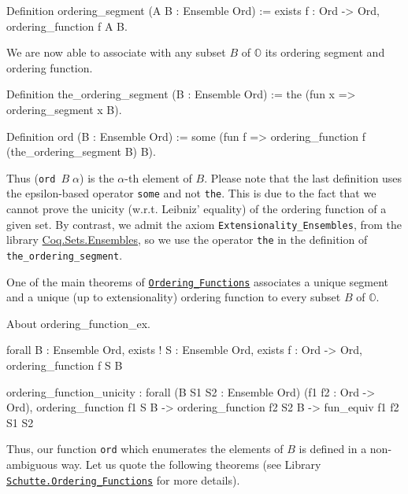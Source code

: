 {\begin{Coqsrc}
Definition ordering_segment (A B : Ensemble Ord) :=
  exists f : Ord -> Ord, ordering_function f A B.
\end{Coqsrc}


We are now able to associate with any subset $B$ of $\mathbb{O}$ its ordering segment and ordering function.

\begin{Coqsrc}
Definition the_ordering_segment (B : Ensemble Ord) :=
  the  (fun x => ordering_segment x B).

Definition ord  (B : Ensemble Ord) := 
  some (fun f => ordering_function f (the_ordering_segment B) B).
\end{Coqsrc}

Thus (\texttt{ord $B \;\alpha$}) is the $\alpha$-th element of $B$.
Please note that the last definition uses the epsilon-based operator \texttt{some} and
not \texttt{the}. This is due to the fact that we cannot prove the unicity (w.r.t. Leibniz' equality) of the ordering function of a given set. 
By contrast, we admit the axiom  \texttt{Extensionality\_Ensembles}, from the library 
\href{https://coq.inria.fr/distrib/current/stdlib/Coq.Sets.Ensembles.html}{Coq.Sets.Ensembles}, so we use the operator \texttt{the} in the definition of
\texttt{the\_ordering\_segment}.

One of the main theorems of
\href{../theories/html/hydras.Schutte.Ordering_Functions.html\#ordering_function_ex}%
{\texttt{Ordering\_Functions}} 
associates a unique segment and a unique (up to extensionality) ordering function to every subset $B$ of $\mathbb{O}$.

\begin{Coqsrc}
About ordering_function_ex.
\end{Coqsrc}

\begin{Coqanswer}
forall B : Ensemble Ord,
 exists ! S : Ensemble Ord, 
      exists f : Ord -> Ord, ordering_function f S B
\end{Coqanswer}


\begin{Coqanswer}
ordering_function_unicity :
forall (B S1 S2 : Ensemble Ord) (f1 f2 : Ord -> Ord),
ordering_function f1 S B ->
ordering_function f2 S2 B -> 
fun_equiv f1 f2 S1 S2
\end{Coqanswer}

Thus,  our function \texttt{ord}  which enumerates the elements of $B$ is defined in a non-ambiguous way.
Let us quote the following theorems (see Library
\href{../theories/html/hydras.Schutte.Ordering_Functions.html}%
{\texttt{Schutte.Ordering\_Functions}} for more details).
 

}
